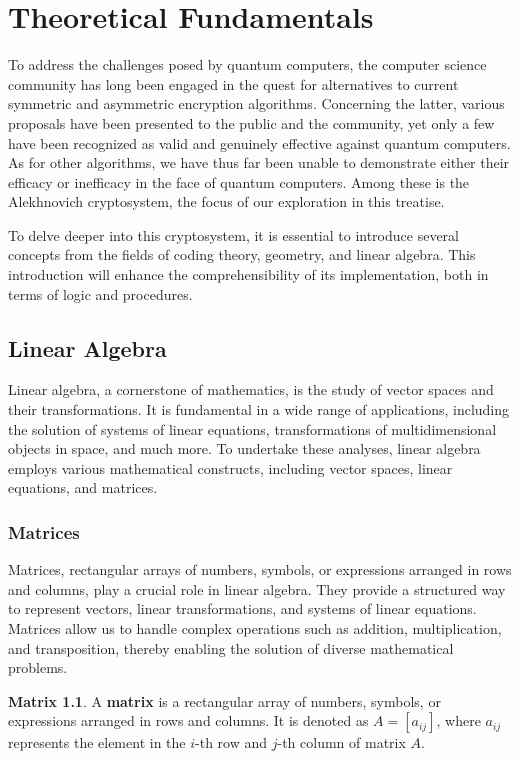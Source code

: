 \chapter{Theoretical Fundamentals}
\theoremstyle{definition}

To address the challenges posed by quantum computers, the computer science 
community has long been engaged in the quest for alternatives to current symmetric and asymmetric encryption algorithms. Concerning the latter, various proposals have been presented to the public and the community, yet only a few have been recognized as valid and genuinely effective against quantum computers. As for other algorithms, we have thus far been unable to demonstrate either their efficacy or inefficacy in the face of quantum computers. Among these is the Alekhnovich cryptosystem, the focus of our exploration in this treatise.

To delve deeper into this cryptosystem, it is essential to introduce several concepts from the fields of coding theory, geometry, and linear algebra. This introduction will enhance the comprehensibility of its implementation, both in terms of logic and procedures.

\section{Linear Algebra}
Linear algebra, a cornerstone of mathematics, is the study of vector spaces and their transformations. It is fundamental in a wide range of applications, including the solution of systems of linear equations, transformations of multidimensional objects in space, and much more. To undertake these analyses, linear algebra employs various mathematical constructs, including vector spaces, linear equations, and matrices.

\subsection{Matrices}
Matrices, rectangular arrays of numbers, symbols, or expressions arranged in rows and columns, play a crucial role in linear algebra. They provide a structured way to represent vectors, linear transformations, and systems of linear equations. Matrices allow us to handle complex operations such as addition, multiplication, and transposition, thereby enabling the solution of diverse mathematical problems.

\theoremstyle{definition}
\newtheorem*{mtx}{Matrix}
\begin{mtx}
A \textbf{matrix} is a rectangular array of numbers, symbols, or expressions arranged in rows and columns. It is denoted as $A = [a_{ij}]$, where $a_{ij}$ represents the element in the $i$-th row and $j$-th column of matrix $A$.
\end{mtx}


